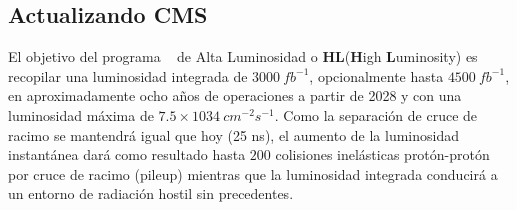 %
%

\subsection{Actualizando CMS }

El objetivo del programa \LHC ~ de Alta Luminosidad o \textbf{HL}(\textbf{H}igh \textbf{L}uminosity) es recopilar una luminosidad integrada de $3000 ~ fb^{-1}$, opcionalmente hasta $4500 ~ fb^{-1}$, en aproximadamente ocho años de operaciones a partir de 2028 y con una luminosidad máxima de $7.5 \times 1034~cm^{-2}s^{-1}$. Como la separación de cruce de racimo se mantendrá igual que hoy (25 ns), el aumento de la luminosidad instantánea dará como resultado hasta $200$ colisiones inelásticas protón-protón por cruce de racimo (pileup) mientras que la luminosidad integrada conducirá a un entorno de radiación hostil sin precedentes. %

